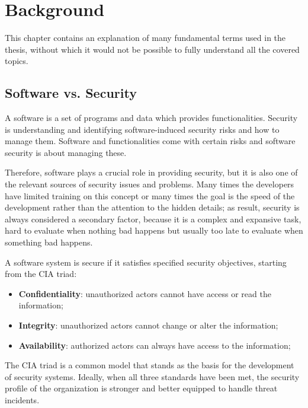 \chapter{Background}
\label{cha:background}


This chapter contains an explanation of many fundamental terms used in the thesis, without which it would not be possible to fully understand all the covered topics.

\section{Software vs. Security}

A software is a set of programs and data which provides functionalities. Security is understanding and identifying software-induced security risks and how to manage them. Software and functionalities come with certain risks and software security is about managing these.

Therefore, software plays a crucial role in providing security, but it is also one of the relevant sources of security issues and problems. Many times the developers have limited training on this concept or many times the goal is the speed of the development rather than the attention to the hidden details; as result, security is always considered a secondary factor, because it is a complex and expansive task, hard to evaluate when nothing bad happens but usually too late to evaluate when something bad happens.~\cite{st-slides}

A software system is secure if it satisfies specified security objectives, starting from the CIA triad:
\begin{itemize}
  \item \textbf{Confidentiality}: unauthorized actors cannot have access or read the information;
  \item \textbf{Integrity}: unauthorized actors cannot change or alter the information;
  \item \textbf{Availability}: authorized actors can always have access to the information;
\end{itemize}
The CIA triad is a common model that stands as the basis for the development of security systems. Ideally, when all three standards have been met, the security profile of the organization is stronger and better equipped to handle threat incidents.~\cite{cia-triad}

